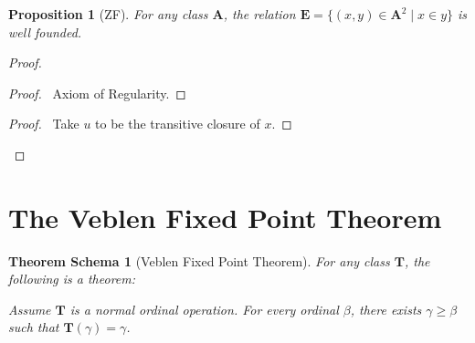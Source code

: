 \documentclass{book}
\let\qed\relax
\newtheorem{prop}[ax]{Proposition}
\newtheorem{thms}[ax]{Theorem Schema}
\theoremstyle{definition}
\begin{document}
\begin{prop}[ZF]
\label{prop:inwellfounded}
For any class $\mathbf{A}$, the relation $\mathbf{E} = \{ (x,y) \in \mathbf{A}^2 \mid x \in y \}$ is well founded.
\end{prop}

\begin{proof}
\pf
{}
\begin{proof}
	\pf\ Axiom of Regularity.
\end{proof}
\begin{proof}
	\pf\ Take $u$ to be the transitive closure of $x$.
\end{proof}
\qed
\end{proof}

\section{The Veblen Fixed Point Theorem}

\begin{thms}[Veblen Fixed Point Theorem]
For any class $\mathbf{T}$, the following is a theorem:

Assume $\mathbf{T}$ is a normal ordinal operation. For every ordinal $\beta$, there exists $\gamma \geq \beta$ such that $\mathbf{T}(\gamma) = \gamma$.
\end{thms}
\end{document}
